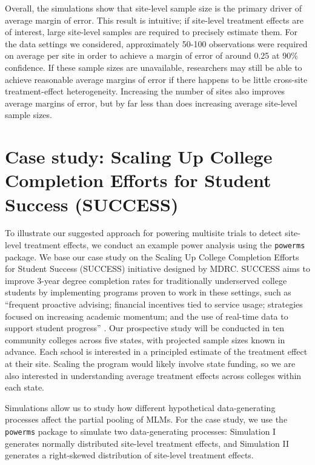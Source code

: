 \documentclass[]{article}
\begin{document}
Overall, the simulations show that site-level sample size is the primary driver of average margin of error.
This result is intuitive; if site-level treatment effects are of interest, large site-level samples are required to precisely estimate them.
For the data settings we considered, approximately 50-100 observations were required on average per site in order to achieve a margin of error of around 0.25 at 90\% confidence.
If these sample sizes are unavailable, researchers may still be able to achieve reasonable average margins of error if there happens to be little cross-site treatment-effect heterogeneity.
Increasing the number of sites also improves average margins of error, but by far less than does increasing average site-level sample sizes.


\section{Case study: Scaling Up College Completion Efforts for Student Success (SUCCESS)}

To illustrate our suggested approach for powering multisite trials to detect site-level treatment effects, we conduct an example power analysis using the \texttt{powerms} package.
We base our case study on the Scaling Up College Completion Efforts for Student Success (SUCCESS) initiative designed by MDRC.
SUCCESS aims to improve 3-year degree completion rates for traditionally underserved college students by implementing programs proven to work in these settings, such as ``frequent proactive advising; financial incentives tied to service usage; strategies focused on increasing academic momentum; and the use of real-time data to support student progress'' \citep{MDRCsuccess}.
Our prospective study will be conducted in ten community colleges across five states, with projected sample sizes known in advance.
Each school is interested in a principled estimate of the treatment effect at their site.
Scaling the program would likely involve state funding, so we are also interested in understanding average treatment effects across colleges within each state.

Simulations allow us to study how different hypothetical data-generating processes affect the partial pooling of MLMs.
For the case study, we use the \texttt{powerms} package to simulate two data-generating processes: Simulation I generates normally distributed site-level treatment effects, and Simulation II generates a right-skewed distribution of site-level treatment effects.
\end{document}

